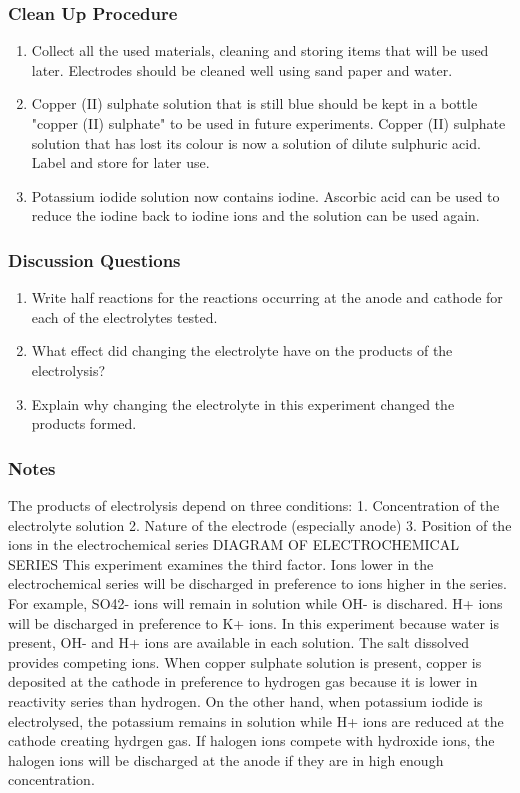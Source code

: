 \subsubsection*{Clean Up Procedure}
\begin{enumerate}
\item{Collect all the used materials, cleaning and storing items that will be used later. Electrodes should be cleaned well using sand paper and water.}
\item{Copper (II) sulphate solution that is still blue should be kept in a bottle "copper (II) sulphate" to be used in future experiments. Copper (II) sulphate solution that has lost its colour is now a solution of dilute sulphuric acid. Label and store for later use.}
\item{Potassium iodide solution now contains iodine. Ascorbic acid can be used to reduce the iodine back to iodine ions and the solution can be used again.}
\end{enumerate}

\subsubsection*{Discussion Questions}
\begin{enumerate}
\item{Write half reactions for the reactions occurring at the anode and cathode for each of the electrolytes tested.}
\item{What effect did changing the electrolyte have on the products of the electrolysis?}
\item{Explain why changing the electrolyte in this experiment changed the products formed.}
\end{enumerate}

\subsubsection*{Notes}
The products of electrolysis depend on three conditions:
1. Concentration of the electrolyte solution
2. Nature of the electrode (especially anode)
3. Position of the ions in the electrochemical series
DIAGRAM OF ELECTROCHEMICAL SERIES
This experiment examines the third factor. Ions lower in the electrochemical series will be discharged in preference to ions higher in the series. For example, SO42- ions will remain in solution while OH- is dischared. H+ ions will be discharged in preference to K+ ions.
In this experiment because water is present, OH- and H+ ions are available in each solution. The salt dissolved provides competing ions. When copper sulphate solution is present, copper is deposited at the cathode in preference to hydrogen gas because it is lower in reactivity series than hydrogen. On the other hand, when potassium iodide is electrolysed, the potassium remains in solution while H+ ions are reduced at the cathode creating hydrgen gas.
If halogen ions compete with hydroxide ions, the halogen ions will be discharged at the anode if they are in high enough concentration.

